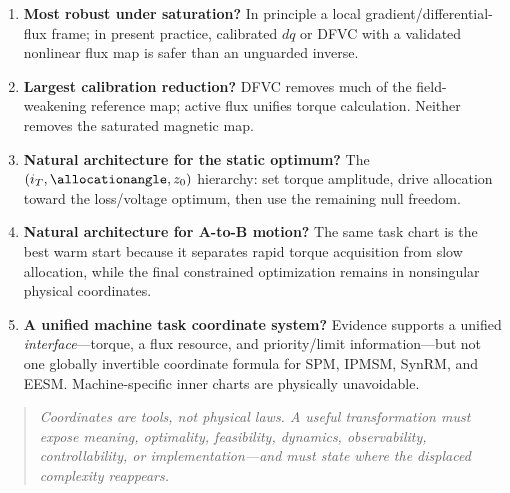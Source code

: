 \begin{enumerate}
 state-dependent task/IOFL frames cost more unless they remove substantial
 maps or calibration.
 \item \textbf{Most robust under saturation?} In principle a local
 gradient/differential-flux frame; in present practice, calibrated \(dq\) or
 DFVC with a validated nonlinear flux map is safer than an unguarded inverse.
 \item \textbf{Largest calibration reduction?} DFVC removes much of the
 field-weakening reference map; active flux unifies torque calculation.
 Neither removes the saturated magnetic map.
 \item \textbf{Natural architecture for the static optimum?} The
 \((i_T,\allocationangle,z_0)\) hierarchy: set torque amplitude, drive allocation toward
 the loss/voltage optimum, then use the remaining null freedom.
 \item \textbf{Natural architecture for A-to-B motion?} The same task chart is
 the best warm start because it separates rapid torque acquisition from slow
 allocation, while the final constrained optimization remains in nonsingular
 physical coordinates.
 \item \textbf{A unified machine task coordinate system?} Evidence supports a
 unified \emph{interface}---torque, a flux resource, and priority/limit
 information---but not one globally invertible coordinate formula for SPM,
 IPMSM, SynRM, and EESM. Machine-specific inner charts are physically
 unavoidable.
\end{enumerate}

\begin{quote}\itshape
Coordinates are tools, not physical laws. A useful transformation must expose
meaning, optimality, feasibility, dynamics, observability, controllability, or
implementation---and must state where the displaced complexity reappears.
\end{quote}

